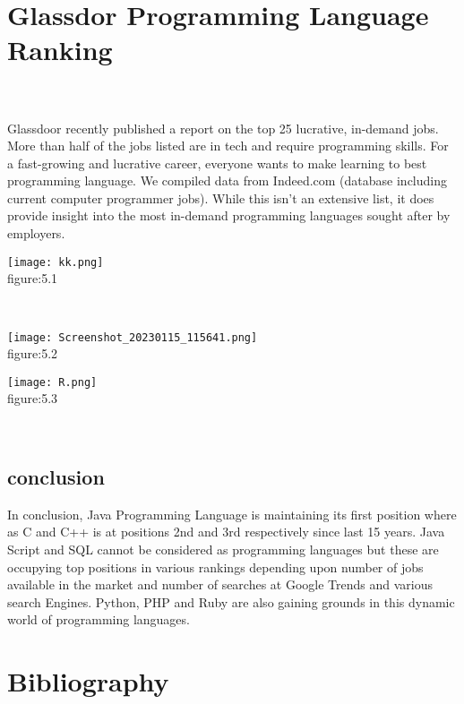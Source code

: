 \documentclass[a4paper, 12pt]{report}
\begin{document}
    \chapter{Glassdor Programming Language Ranking}
    \\
    \\
    Glassdoor recently published a report on the top 25 lucrative, in-demand jobs. More than half of the jobs listed are in tech and 
require programming skills. For a fast-growing and lucrative career, everyone wants to make learning to best programming 
language. We compiled data from Indeed.com (database including current computer programmer jobs). While this isn’t an 
extensive list, it does provide insight into the most in-demand programming languages sought after by employers.\\
\begin{center}
    \texttt{[image: kk.png]}\\
    figure:5.1\\
\end{center}\\
\begin{center}
    \texttt{[image: Screenshot\_20230115\_115641.png]}\\
    figure:5.2\\
\end{center}
\begin{center}
    \texttt{[image: R.png]}\\
    figure:5.3\\
\end{center}\\
\begin{center}
\chapter{conclusion}
In conclusion, Java Programming Language is maintaining its first position where as C and C++ is at positions 2nd and 3rd
respectively since last 15 years. Java Script and SQL cannot be considered as programming languages but these are occupying top 
positions in various rankings depending upon number of jobs available in the market and number of searches at Google Trends 
and various search Engines. Python, PHP and Ruby are also gaining grounds in this dynamic world of programming languages. 
\end{center}
\chapter{Bibliography} 
\end{document}
